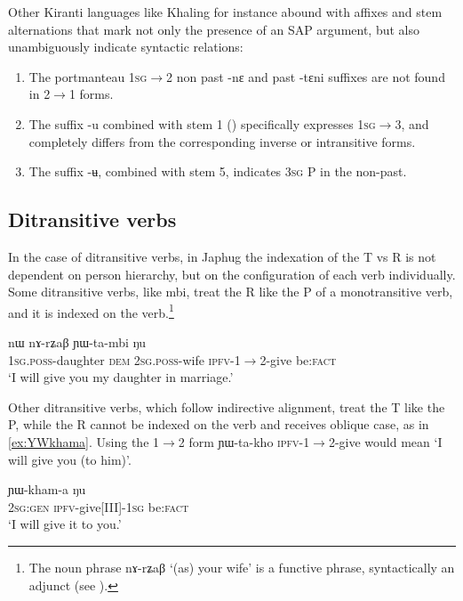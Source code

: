 \documentclass[oldfontcommands,oneside,a4paper,11pt]{article}
\newcommand{\ipa}[1]{{\phon \mbox{#1}}} %
\begin{document}
Other Kiranti languages like Khaling for instance abound with affixes and stem alternations that mark not only the presence of an SAP argument, but also unambiguously indicate syntactic relations:

\begin{enumerate}
\item The portmanteau \textsc{1sg$\rightarrow$2} non past \ipa{-nɛ} and past \ipa{-tɛni} suffixes are not found in 2$\rightarrow$1 forms.
\item The suffix \ipa{-u}  combined with stem 1 (\citealt[1104]{jacques12khaling}) specifically expresses \textsc{1sg$\rightarrow$3}, and completely differs from the corresponding inverse or intransitive forms.
\item The suffix \ipa{-ʉ}, combined with stem 5, indicates \textsc{3sg} P in the non-past.
\end{enumerate}


\subsection{Ditransitive verbs}
In the case of ditransitive verbs, in Japhug the indexation of the T vs R is not dependent on person hierarchy, but on the configuration of each verb individually. Some ditransitive verbs, like \ipa{mbi}, treat the R like the P of a monotransitive verb, and it is indexed on the verb.\footnote{The noun phrase \ipa{nɤ-rʑaβ} `(as) your wife' is a functive phrase, syntactically an adjunct (see \citealt{creissels14functive}).}

\begin{exe}
\ex \label{ex:YWtambi}
\gll \ipa{a-me} 	\ipa{nɯ} 	\ipa{nɤ-rʑaβ} 	\ipa{ɲɯ-ta-mbi} 	\ipa{ŋu} \\
\textsc{1sg.poss}-daughter \textsc{dem} \textsc{2sg.poss}-wife \textsc{ipfv}-1$\rightarrow$2-give be:\textsc{fact} \\
\glt `I will give you my daughter in marriage.'
\end{exe}

Other ditransitive verbs, which follow indirective alignment, treat the T like the P, while the R cannot be indexed on the verb and receives oblique case, as in \ref{ex:YWkhama}. Using the 1$\rightarrow$2 form \ipa{ɲɯ-ta-kho} \textsc{ipfv}-1$\rightarrow$2-give would mean `I will give you (to him)'.

\begin{exe}
\ex \label{ex:YWkhama}
\gll \ipa{nɤʑɯɣ} 	\ipa{ɲɯ-kham-a} \ipa{ŋu} \\
\textsc{2sg:gen} \textsc{ipfv}-give[III]-\textsc{1sg} be:\textsc{fact} \\
\glt `I will give it to you.'
\end{exe}
\end{document}
